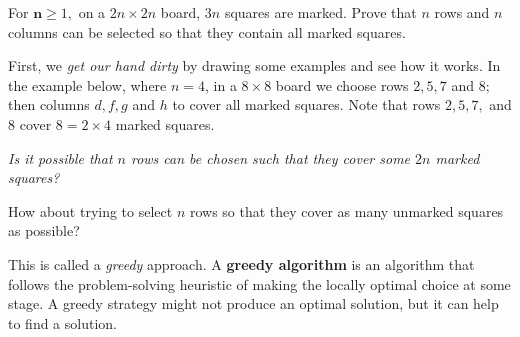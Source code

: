 \documentclass{article}
\begin{document}
\newpage
    
\begin{example*}[Two]
    \label{example:two}
    For $\textbf{n} \ge 1,$ on a $2n \times 2n$ board, $3n$ squares are marked.
    Prove that $n$ rows and $n$ columns can be selected so that they contain all marked squares.
\end{example*}

\begin{remark*}
    First, we \textit{get our hand dirty} by drawing some examples and see how it works.
    In the example below, where $n=4$, in a $8\times 8$ board we choose rows $2,5,7$ and $8;$ then columns $d,f,g$ and $h$
    to cover all marked squares.
    Note that rows $2,5,7,$ and $8$ cover $8 = 2 \times 4$ marked squares.

    \textit{Is it possible that $n$ rows can be chosen such that they cover some $2n$ marked squares?}

    How about trying to select $n$ rows so that they cover as many unmarked squares as possible?
    
    This is called a \textit{greedy} approach. A \textbf{greedy algorithm} is an algorithm
    that follows the problem-solving heuristic of making the locally optimal choice at some stage.
    A greedy strategy might not produce an optimal solution, but it can help to find a solution.
\end{remark*}
\end{document}
